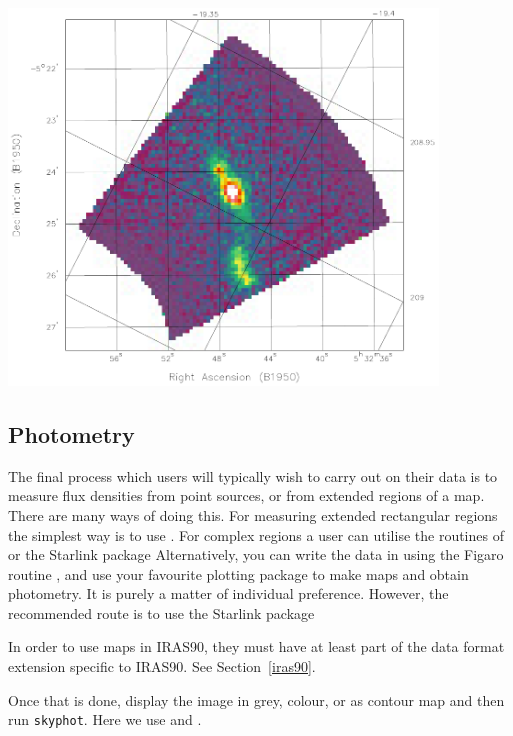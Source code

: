 \documentclass[11pt,noabs]{starlink}
\begin{document}
\begin{center}
\leavevmode\includegraphics[height=100mm]{sc1_figure}
\end{center}

\subsection{\label{photo}Photometry}

   The final process which users will typically wish to carry out on
   their data is to measure flux densities from point sources, or from
   extended regions of a map. There are many ways of doing this. For
   measuring extended rectangular regions the simplest way is to use
\texttt{}.
   For complex regions a user can utilise the routines of
   or the Starlink package
   Alternatively, you can write the data in
   using the Figaro routine
\texttt{},
   and use your favourite plotting package to make maps and obtain
   photometry. It is purely a matter of individual preference. However,
   the recommended route is to use the Starlink package

   In order to use maps in IRAS90, they must have at least part
   of the data format extension specific to IRAS90. See
Section~\ref{iras90}.

   Once that is done, display the image in grey, colour, or as contour
   map and then run \texttt{skyphot}. Here we use
\texttt{}
   and
\texttt{}.
\end{document}
